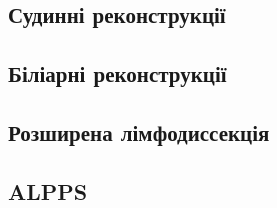 \begin{refsection}
\subsection{Судинні реконструкції}
\subsection{Біліарні реконструкції}
\subsection{Розширена лімфодиссекція}
\subsection{ALPPS}
\printbibliography[heading=subbibliography]
\end{refsection}


